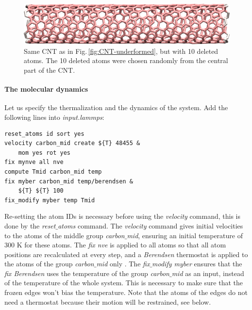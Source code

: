 \documentclass[9pt,tutorial]{livecoms}
\begin{document}
\begin{figure}
\centering
\includegraphics[width=\linewidth]{CNT-underformed-deleted}
\caption{Same CNT as in Fig.\,\ref{fig:CNT-underformed}, but with 10 deleted atoms. The 10 deleted atoms were chosen randomly from the central part of the CNT.}
\label{fig:CNT-underformed-deleted}
\end{figure}

\paragraph{The molecular dynamics}
Let us specify the thermalization and the dynamics of the system. Add the following lines into \textit{input.lammps}:
{\normalsize \begin{verbatim}
reset_atoms id sort yes
velocity carbon_mid create ${T} 48455 & 
    mom yes rot yes
fix mynve all nve
compute Tmid carbon_mid temp
fix myber carbon_mid temp/berendsen &
    ${T} ${T} 100
fix_modify myber temp Tmid
\end{verbatim}}
Re-setting the atom IDs is necessary before using the \textit{velocity} command, this is done by the \textit{reset$\_$atoms} command.
The \textit{velocity} command gives initial velocities to the atoms of the middle group \textit{carbon$\_$mid}, ensuring an initial temperature of 300 K for these atoms. The \textit{fix nve} is applied to all atoms so that all atom positions are recalculated at every step, and a \textit{Berendsen} thermostat is applied to the atoms of the group \textit{carbon$\_$mid} only \cite{berendsen1984molecular}. The \textit{fix$\_$modify myber} ensures that the \textit{fix Berendsen} uses the temperature of the group \textit{carbon$\_$mid} as an input, instead of the temperature of the whole system. This is necessary to make sure that the frozen edges won't bias the temperature. Note that the atoms
of the edges do not need a thermostat because their motion will be restrained, see below.
\end{document}
